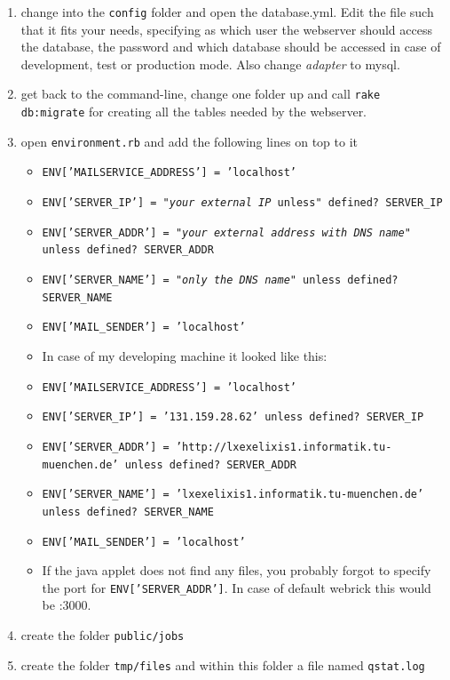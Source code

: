 \documentclass{scrartcl}
\begin{document}
\begin{enumerate}
				\item change into the  \texttt{config} folder and open the database.yml. Edit the file such that it fits your needs, specifying as which user the webserver should access the database, the password and which database should be accessed in case of development, test or production mode.  Also change \textit{adapter} to mysql.
				\item get back to the command-line, change one folder up and call \texttt{rake db:migrate} for creating all the tables needed by the webserver.
				\item open \texttt{environment.rb} and add the following lines on top to it 
					\begin{itemize}
						\item[] \texttt{ENV['MAILSERVICE\_ADDRESS'] = 'localhost'}
						\item[] \texttt{ENV['SERVER\_IP'] = "\textit{your external IP} unless" defined? SERVER\_IP }
						\item[] \texttt{ENV['SERVER\_ADDR'] = "\textit{your external address with DNS name}" unless defined? SERVER\_ADDR}
						\item[] \texttt{ENV['SERVER\_NAME'] = "\textit{only the DNS name}" unless defined? SERVER\_NAME}
						\item[] \texttt{ENV['MAIL\_SENDER'] = 'localhost'}
						\item[] In case of my developing machine it looked like this:
						\item[] \texttt{ENV['MAILSERVICE\_ADDRESS'] = 'localhost'}
						\item[] \texttt{ENV['SERVER\_IP'] =  '131.159.28.62' unless defined? SERVER\_IP }
						\item[] \texttt{ENV['SERVER\_ADDR'] =  'http://lxexelixis1.informatik.tu-muenchen.de' unless defined? SERVER\_ADDR}
						\item[] \texttt{ENV['SERVER\_NAME'] =  'lxexelixis1.informatik.tu-muenchen.de' unless defined? SERVER\_NAME}
						\item[] \texttt{ENV['MAIL\_SENDER'] = 'localhost'}
						\item[] If the java applet does not find any files, you probably forgot to specify the port for \texttt{ENV['SERVER\_ADDR']}. In case of default webrick this would be :3000. 
					\end{itemize}
				\item create the folder \texttt{public/jobs}
				\item create the folder \texttt{tmp/files} and within this folder a file named \texttt{qstat.log}
				\end{enumerate}
				
\end{document}
